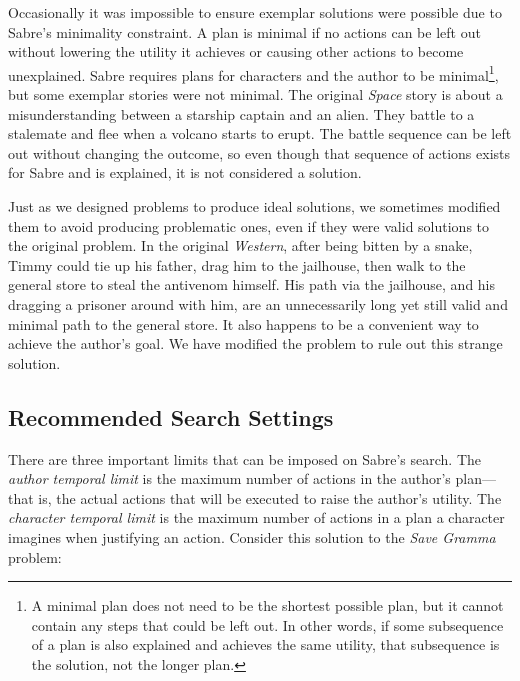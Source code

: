 \documentclass{nilreport}
\begin{document}
Occasionally it was impossible to ensure exemplar solutions were possible
due to Sabre's minimality constraint. A plan is minimal if no actions
can be left out without lowering the utility it achieves or causing
other actions to become unexplained. Sabre requires plans for characters
and the author to be minimal\footnote{A minimal plan does not need to be the shortest possible plan, but
it cannot contain any steps that could be left out. In other words,
if some subsequence of a plan is also explained and achieves the same
utility, that subsequence is the solution, not the longer plan.}, but some exemplar stories were not minimal. The original \emph{Space}
story is about a misunderstanding between a starship captain and an
alien. They battle to a stalemate and flee when a volcano starts to
erupt. The battle sequence can be left out without changing the outcome,
so even though that sequence of actions exists for Sabre and is explained,
it is not considered a solution.

Just as we designed problems to produce ideal solutions, we sometimes
modified them to avoid producing problematic ones, even if they were
valid solutions to the original problem. In the original \emph{Western},
after being bitten by a snake, Timmy could tie up his father, drag
him to the jailhouse, then walk to the general store to steal the
antivenom himself. His path via the jailhouse, and his dragging a
prisoner around with him, are an unnecessarily long yet still valid
and minimal path to the general store. It also happens to be a convenient
way to achieve the author's goal. We have modified the problem to
rule out this strange solution.

\subsection{Recommended Search Settings}

There are three important limits that can be imposed on Sabre's search.
The \emph{author temporal limit} is the maximum number of actions
in the author's plan---that is, the actual actions that will be executed
to raise the author's utility. The \emph{character temporal limit}
is the maximum number of actions in a plan a character imagines when
justifying an action. Consider this solution to the \emph{Save Gramma}
problem:

\medskip{}

\noindent{}
\end{document}
